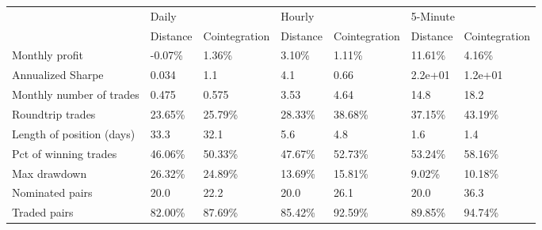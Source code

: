 \begin{tabular}{lllllll}
\toprule
{} & \multicolumn{2}{l}{Daily} & \multicolumn{2}{l}{Hourly} & \multicolumn{2}{l}{5-Minute} \\
{} & Distance & Cointegration & Distance & Cointegration & Distance & Cointegration \\
\midrule
Monthly profit            &  -0.07\% &        1.36\% &   3.10\% &        1.11\% &  11.61\% &        4.16\% \\
Annualized Sharpe         &    0.034 &           1.1 &      4.1 &          0.66 &  2.2e+01 &       1.2e+01 \\
Monthly number of trades  &    0.475 &         0.575 &     3.53 &          4.64 &     14.8 &          18.2 \\
Roundtrip trades          &  23.65\% &       25.79\% &  28.33\% &       38.68\% &  37.15\% &       43.19\% \\
Length of position (days) &     33.3 &          32.1 &      5.6 &           4.8 &      1.6 &           1.4 \\
Pct of winning trades     &  46.06\% &       50.33\% &  47.67\% &       52.73\% &  53.24\% &       58.16\% \\
Max drawdown              &  26.32\% &       24.89\% &  13.69\% &       15.81\% &   9.02\% &       10.18\% \\
Nominated pairs           &     20.0 &          22.2 &     20.0 &          26.1 &     20.0 &          36.3 \\
Traded pairs              &  82.00\% &       87.69\% &  85.42\% &       92.59\% &  89.85\% &       94.74\% \\
\bottomrule
\end{tabular}
